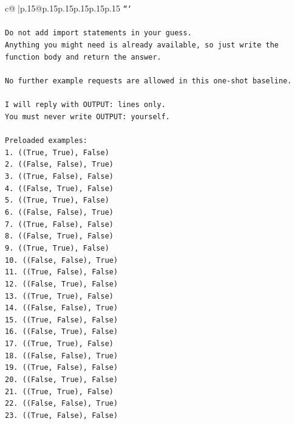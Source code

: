 \documentclass{article}
\begin{document}
{\begin{supertabular}{c@{$\;$}|p{.15\linewidth}@{}p{.15\linewidth}p{.15\linewidth}p{.15\linewidth}p{.15\linewidth}p{.15\linewidth}}
{{{\texttt{```} \\
\\ 
\texttt{Do not add import statements in your guess.} \\
\texttt{Anything you might need is already available, so just write the function body and return the answer.} \\
\\ 
\texttt{No further example requests are allowed in this one{-}shot baseline.} \\
\\ 
\texttt{I will reply with OUTPUT: lines only.} \\
\texttt{You must never write OUTPUT: yourself.} \\
\\ 
\texttt{Preloaded examples:} \\
\texttt{1. ((True, True), False)} \\
\texttt{2. ((False, False), True)} \\
\texttt{3. ((True, False), False)} \\
\texttt{4. ((False, True), False)} \\
\texttt{5. ((True, True), False)} \\
\texttt{6. ((False, False), True)} \\
\texttt{7. ((True, False), False)} \\
\texttt{8. ((False, True), False)} \\
\texttt{9. ((True, True), False)} \\
\texttt{10. ((False, False), True)} \\
\texttt{11. ((True, False), False)} \\
\texttt{12. ((False, True), False)} \\
\texttt{13. ((True, True), False)} \\
\texttt{14. ((False, False), True)} \\
\texttt{15. ((True, False), False)} \\
\texttt{16. ((False, True), False)} \\
\texttt{17. ((True, True), False)} \\
\texttt{18. ((False, False), True)} \\
\texttt{19. ((True, False), False)} \\
\texttt{20. ((False, True), False)} \\
\texttt{21. ((True, True), False)} \\
\texttt{22. ((False, False), True)} \\
\texttt{23. ((True, False), False)} \\
}}}
\end{supertabular}}
\end{document}
